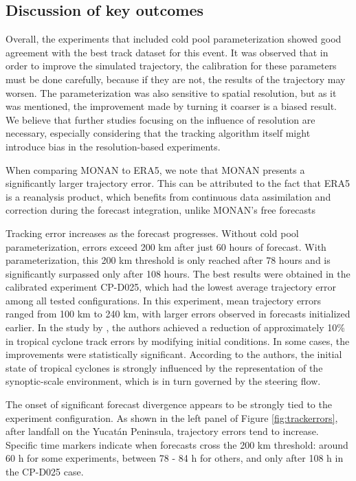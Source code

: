 \subsection{Discussion of key outcomes}

Overall, the experiments that included cold pool parameterization showed good agreement with the best track dataset for this event. It was observed that in order to improve the simulated trajectory, the calibration for these parameters must be done carefully, because if they are not, the results of the trajectory may worsen. The parameterization was also sensitive to spatial resolution, but as it was mentioned, the improvement made by turning it coarser is a biased result. We believe that further studies focusing on the influence of resolution are necessary, especially considering that the tracking algorithm itself might introduce bias in the resolution-based experiments.

When comparing MONAN to ERA5, we note that MONAN presents a significantly larger trajectory error. This can be attributed to the fact that ERA5 is a reanalysis product, which benefits from continuous data assimilation and correction during the forecast integration, unlike MONAN's free forecasts

Tracking error increases as the forecast progresses. Without cold pool parameterization, errors exceed 200 km after just 60 hours of forecast. With parameterization, this 200 km threshold is only reached after 78 hours and is significantly surpassed only after 108 hours. The best results were obtained in the calibrated experiment CP-D025, which had the lowest average trajectory error among all tested configurations. In this experiment, mean trajectory errors ranged from 100 km to 240 km, with larger errors observed in forecasts initialized earlier. In the study by , the authors achieved a reduction of approximately 10\% in tropical cyclone track errors by modifying initial conditions. In some cases, the improvements were statistically significant. According to the authors, the initial state of tropical cyclones is strongly influenced by the representation of the synoptic-scale environment, which is in turn governed by the steering flow.

The onset of significant forecast divergence appears to be strongly tied to the experiment configuration. As shown in the left panel of Figure \ref{fig:trackerrors}, after landfall on the Yucatán Peninsula, trajectory errors tend to increase. Specific time markers indicate when forecasts cross the 200 km threshold: around 60 h for some experiments, between 78 - 84 h for others, and only after 108 h in the CP-D025 case.

